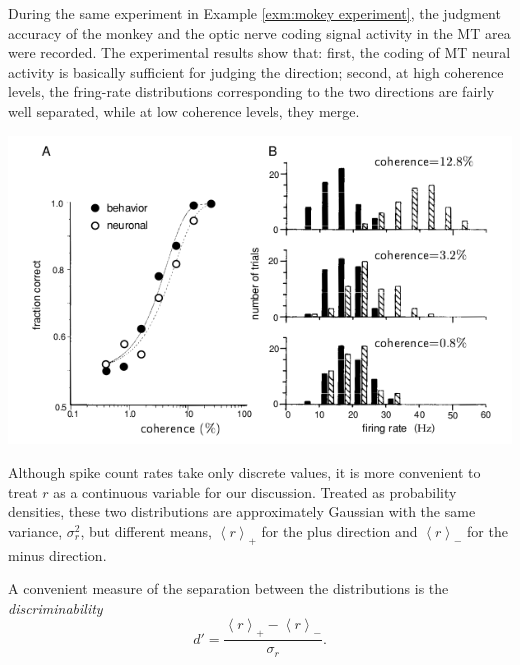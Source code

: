 \begin{exm}
  \label{fig:random-dot motion-
discrimination task}
  During the same experiment in Example \ref{exm:mokey experiment}, the judgment
  accuracy of the monkey and the optic nerve coding signal activity in
  the MT area were recorded. The experimental results show that: first,
  the coding of MT neural activity is basically sufficient for judging
  the direction; second, at high coherence levels, the fring-rate distributions
corresponding to the two directions are fairly well separated, while
at low coherence levels, they merge.
\begin{center}
  \centering
 \includegraphics[scale = 0.4]{png/3-2AB}
  \label{fig:3.2A}
\end{center}

\end{exm}

\begin{rem}
  Although spike count rates take only discrete values, it is more
  convenient to treat $r$ as a continuous variable for our
  discussion. Treated as probability densities, these two
  distributions are approximately Gaussian with the same variance, $\sigma_{r}^{2}$, but different means,
$\left\langle r \right\rangle_{+}$ for the plus direction and $\left\langle r \right\rangle_{-}$ for the minus direction.
\end{rem}

\begin{defn}[discriminability]
  \label{defn:discriminability}
  A convenient
measure of the separation between the distributions is the
\emph{discriminability}
\begin{equation}
  \label{eq:3.4}
  d'=\frac{\left\langle r \right\rangle_{+}-\left\langle r \right\rangle_{-}}{\sigma_{r}}.
\end{equation}
\end{defn}


